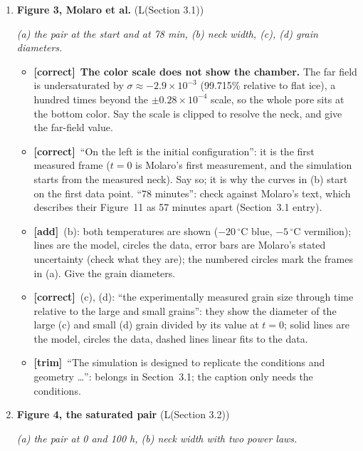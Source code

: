 \documentclass[11pt]{article}
\newcommand{\Pg}[3]{\item \textbf{#1} {\small(#2)}\par\textit{#3}}
\newcommand{\tC}{\textcolor{miss}{\textbf{[correct]}}\ }
\newcommand{\tG}{\textcolor{stale}{\textbf{[wording]}}\ }
\newcommand{\tT}{\textcolor{cut}{\textbf{[trim]}}\ }
\newcommand{\tA}{\textcolor{have}{\textbf{[add]}}\ }
\begin{document}
\begin{enumerate}
\begin{itemize}
    $y$ problem). Missing period after (c).
  \item \tA (d): color is on a logarithmic scale; ``per unit mean gradient
    in the $x$ direction'' is right; ``brightness of the path'':
    ``brighter paths carry more heat''.
  \item \tG ``the mesh in which we solve our homogenization model over'':
    ``the mesh on which the cell problem is solved''.
  \end{itemize}
\Pg{Figure 3, Molaro et al.}{L(Section 3.1)}{(a) the pair at the start and at 78 min, (b) neck width, (c), (d) grain diameters.}
  \begin{itemize}
  \item \tC \textbf{The color scale does not show the chamber.} The far
    field is undersaturated by $\sigma \approx -2.9\times10^{-3}$ (99.715\%
    relative to flat ice), a hundred times beyond the $\pm0.28\times10^{-4}$
    scale, so the whole pore sits at the bottom color. Say the scale is
    clipped to resolve the neck, and give the far-field value.
  \item \tC ``On the left is the initial configuration'': it is the first
    measured frame ($t = 0$ is Molaro's first measurement, and the
    simulation starts from the measured neck). Say so; it is why the curves
    in (b) start on the first data point. ``78 minutes'': check against
    Molaro's text, which describes their Figure~11 as 57 minutes apart
    (Section~3.1 entry).
  \item \tA (b): both temperatures are shown ($-20\,^{\circ}$C blue,
    $-5\,^{\circ}$C vermilion); lines are the model, circles the data, error
    bars are Molaro's stated uncertainty (check what they are); the numbered
    circles mark the frames in (a). Give the grain diameters.
  \item \tC (c), (d): ``the experimentally measured grain size through time
    relative to the large and small grains'': they show the diameter of the
    large (c) and small (d) grain divided by its value at $t = 0$; solid
    lines are the model, circles the data, dashed lines linear fits to the
    data.
  \item \tT ``The simulation is designed to replicate the conditions and
    geometry \ldots'': belongs in Section~3.1; the caption only needs the
    conditions.
  \end{itemize}
\Pg{Figure 4, the saturated pair}{L(Section 3.2)}{(a) the pair at 0 and 100 h, (b) neck width with two power laws.}
  \begin{itemize}

\end{itemize}
\end{enumerate}
\end{document}
